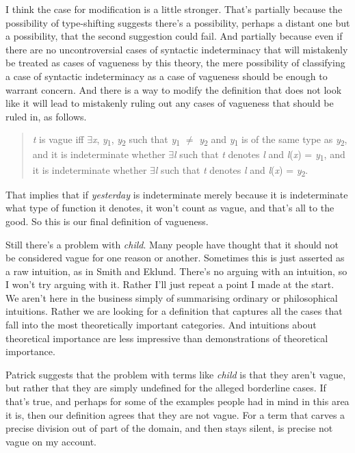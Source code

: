 I think the case for modification is a little stronger. That's partially because the possibility of type-shifting suggests there's a possibility, perhaps a distant one but a possibility, that the second suggestion could fail. And partially because even if there are no uncontroversial cases of syntactic indeterminacy that will mistakenly be treated as cases of vagueness by this theory, the mere possibility of classifying a case of syntactic indeterminacy as a case of vagueness should be enough to warrant concern. And there is a way to modify the definition that does not look like it will lead to mistakenly ruling out any cases of vagueness that should be ruled in, as follows.

\begin{quote}
\textit{t} is vague iff ${\exists}$\textit{x}, \textit{y}\textsubscript{1}, \textit{y}\textsubscript{2} such that \textit{y}\textsubscript{1} ${\neq}$ \textit{y}\textsubscript{2} and \textit{y}\textsubscript{1} is of the same type as \textit{y}\textsubscript{2}, and it is indeterminate whether ${\exists}$\textit{l} such that \textit{t} denotes \textit{l} and \textit{l}(\textit{x}) = \textit{y}\textsubscript{1}, and it is indeterminate whether ${\exists}$\textit{l} such that \textit{t} denotes \textit{l} and \textit{l}(\textit{x}) = \textit{y}\textsubscript{2}.
\end{quote}

\noindent That implies that if \textit{yesterday} is indeterminate merely because it is indeterminate what type of function it denotes, it won't count as vague, and that's all to the good. So this is our final definition of vagueness.

Still there's a problem with \textit{child}. Many people have thought that it should not be considered vague for one reason or another. Sometimes this is just asserted as a raw intuition, as in Smith and Eklund. There's no arguing with an intuition, so I won't try arguing with it. Rather I'll just repeat a point I made at the start. We aren't here in the business simply of summarising ordinary or philosophical intuitions. Rather we are looking for a definition that captures all the cases that fall into the most theoretically important categories. And intuitions about theoretical importance are less impressive than demonstrations of theoretical importance.

Patrick \citet{Greenough2003} suggests that the problem with terms like \textit{child} is that they aren't vague, but rather that they are simply undefined for the alleged borderline cases. If that's true, and perhaps for some of the examples people had in mind in this area it is, then our definition agrees that they are not vague. For a term that carves a precise division out of part of the domain, and then stays silent, is precise not vague on my account.

